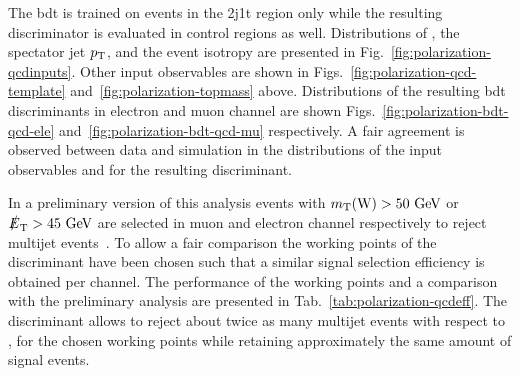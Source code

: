 The \gls{bdt} is trained on events in the 2j1t region only while the resulting discriminator is evaluated in control regions as well. Distributions of \mtw, the spectator jet $p_\textrm{T}$, and the event isotropy are presented in Fig.~\ref{fig:polarization-qcdinputs}. Other input observables are shown in Figs.~\ref{fig:polarization-qcd-template} and~\ref{fig:polarization-topmass} above. Distributions of the resulting \gls{bdt} discriminants in electron and muon channel are shown Figs.~\ref{fig:polarization-bdt-qcd-ele} and~\ref{fig:polarization-bdt-qcd-mu} respectively. A fair agreement is observed between data and simulation in the distributions of the input observables and for the resulting discriminant.


In a preliminary version of this analysis events with $m_{\textrm{T}}(\textrm{W})>50~\textrm{GeV}$ or $\slashed{E}_{\textrm{T}}>45~\textrm{GeV}$ are selected in muon and electron channel respectively to reject multijet events~\cite{CMS-PAS-TOP-13-001}. To allow a fair comparison the working points of the \bdtqcd discriminant have been chosen such that a similar signal selection efficiency is obtained per channel. The performance of the working points and a comparison with the preliminary analysis are presented in Tab.~\ref{tab:polarization-qcdeff}. The \bdtqcd discriminant allows to reject about twice as many multijet events with respect to \mtw, \met for the chosen working points while retaining approximately the same amount of signal events.

